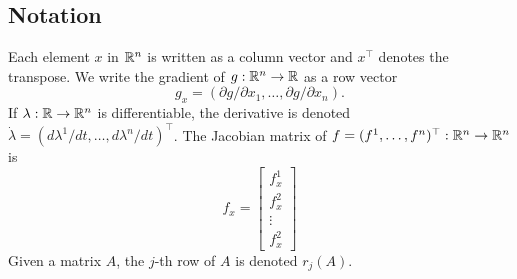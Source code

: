 \subsection*{Notation} Each element $x$ in $\mathbb{R}^n$ is written as a column vector 
and 
$x^\top$ denotes the transpose. We write the gradient of $g:\mathbb{R}^n\to\mathbb{R}$ as a row 
vector 
    \[ g_x =(\partial g/\partial x_1,\ldots, \partial g/\partial x_n). \]
If $\lambda:\mathbb{R}\to\mathbb{R}^n$ is differentiable, the derivative is denoted 
$\dot{\lambda}=(d\lambda^1/dt,\ldots,d\lambda^n/dt)^\top$. The Jacobian matrix 
of $f=(f^1,\ldots,f^n)^\top:\mathbb{R}^n\to\mathbb{R}^n$ is   
\[f_x=
  \begin{bmatrix}
    f^1_x\\
    f^2_x\\
    \vdots \\
    f^2_x
  \end{bmatrix}
 \]
Given a matrix $A$, the $j$-th row of $A$ is denoted $r_j(A)$.
